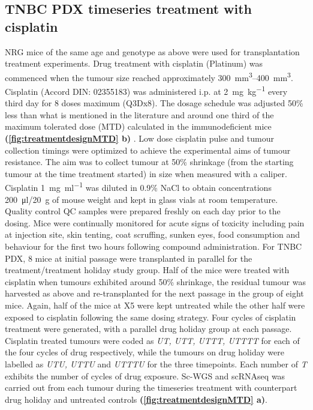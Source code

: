  
\subsection{TNBC PDX timeseries treatment with cisplatin}
\label{ssec:rx}
NRG mice of the same age and genotype as above were used for transplantation treatment experiments. Drug treatment with cisplatin (Platinum) was commenced when the tumour size reached approximately \SIrange{300}{400}{\mm\cubed}. Cisplatin (Accord DIN: 02355183)  was administered i.p. at \SI{2}{\mg\per\kg} every third day for 8 doses maximum (Q3Dx8). The dosage schedule was adjusted 50\% less than what is mentioned in the literature \cite{li2013enhanced,wang2013klotho} and around one third of the maximum tolerated dose (MTD) calculated in the immunodeficient mice  \textbf{(\autoref{fig:treatmentdesignMTD} b)} . Low dose cisplatin pulse and tumour collection timings were optimized to achieve the experimental aims of tumour resistance. The aim was to collect tumour at 50\% shrinkage (from the starting tumour at the time treatment started) in size when measured with a caliper. Cisplatin \SI{1}{\mg\per\ml} was diluted in 0.9\% NaCl to obtain concentrations \SI{200}{\ul}/\SI{20}{\g} of mouse weight and kept in glass vials at room temperature. Quality control \ac{QC} samples were prepared freshly on each day prior to the dosing. Mice were continually monitored for acute signs of toxicity including pain at injection site, skin tenting, coat scruffing, sunken eyes, food consumption and behaviour for the first two hours following compound administration. For TNBC PDX, 8 mice at initial passage were transplanted in parallel for the treatment/treatment holiday study group. Half of the mice were treated with cisplatin when tumours exhibited around 50\% shrinkage, the residual tumour was harvested as above and re-transplanted for the next passage in the group of eight mice. Again, half of the mice at X5 were kept untreated while the other half were exposed to cisplatin following the same dosing strategy. Four cycles of cisplatin treatment were generated, with a parallel drug holiday group at each passage. Cisplatin treated tumours were coded as \textit{UT, UTT, UTTT, UTTTT} for each of the four cycles of drug respectively, while the tumours on drug holiday were labelled as \textit{UTU, UTTU} and \textit{UTTTU} for the three timepoints. Each number of \textit{T} exhibits the number of cycles of drug exposure. Sc-WGS and scRNAseq was carried out from each tumour during the timeseries treatment with counterpart drug holiday and untreated controls  \textbf{(\autoref{fig:treatmentdesignMTD} a)}.

